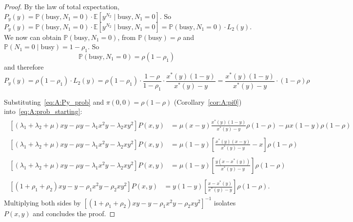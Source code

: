 \begin{proof}
    By the law of total expectation, $P_y(y)=\mathbb{P}(\text{busy},N_1=0)\cdot\mathbb{E}[y^{N_2}\mid\text{busy},N_1=0]$. So
    \begin{equation*}
        P_y(y)=\mathbb{P}(\text{busy},N_1=0)\cdot\mathbb{E}[y^{N_2}\mid\text{busy},N_1=0] = \mathbb{P}(\text{busy},N_1=0)\cdot L_2(y).
    \end{equation*}
    We now can obtain $\mathbb{P}(\text{busy},N_1=0)$, from $\mathbb{P}(\text{busy})=\rho$ and $\mathbb{P}(N_1=0 \mid \text{busy})=1-\rho_1$. So 
    \begin{equation*}
        \mathbb{P}(\text{busy},N_1=0)=\rho(1-\rho_1)
    \end{equation*}
    and therefore
    \begin{equation}
        P_y(y) = \rho(1-\rho_1)\cdot L_2(y) = \rho(1-\rho_1)\cdot\frac{1-\rho}{1-\rho_1} \cdot \frac{x^*(y)(1-y)}{x^*(y) - y} = \frac{x^*(y)(1-y)}{x^*(y) - y} \cdot (1-\rho) \rho
        \label{eq:A:Py_prob}
    \end{equation}

    Substituting~\eqref{eq:A:Py_prob} and $\pi(0,0)=\rho(1-\rho)$ (Corollary~\ref{cor:A:pi0})
    into~\eqref{eq:A:prob_starting}:
    \begin{align*}
        \begin{split}
            \left[ (\lambda_1+\lambda_2+\mu)xy - \mu y - \lambda_1 x^2y - \lambda_2 xy^2 \right] P(x,y)
            &= \mu(x-y) \frac{x^*(y)(1-y)}{x^*(y)-y} \rho(1-\rho) - \mu x(1-y) \rho(1-\rho)
        \end{split} \\
        \begin{split}
            \left[ (\lambda_1+\lambda_2+\mu)xy - \mu y - \lambda_1 x^2y - \lambda_2 xy^2 \right] P(x,y)&= \mu(1-y) \left[ \frac{x^*(y)(x-y)}{x^*(y)-y} - x \right] \rho(1-\rho)
        \end{split} \\
        \begin{split}
            \left[ (\lambda_1+\lambda_2+\mu)xy - \mu y - \lambda_1 x^2y - \lambda_2 xy^2 \right] P(x,y)&= \mu(1-y) \left[ \frac{y(x-x^*(y))}{x^*(y)-y} \right] \rho(1-\rho)
        \end{split} \\
        \begin{split}
            \left[ (1+\rho_1+\rho_2)xy - y - \rho_1 x^2y - \rho_2 xy^2 \right] P(x,y)
            &= y(1-y) \left[ \frac{x-x^*(y)}{x^*(y)-y} \right] \rho(1-\rho).
        \end{split}
    \end{align*}
    Multiplying both sides by $\left[ (1+\rho_1+\rho_2)xy - y - \rho_1 x^2y - \rho_2 xy^2 \right]^{-1}$
    isolates $P(x,y)$ and concludes the proof.
\end{proof}


